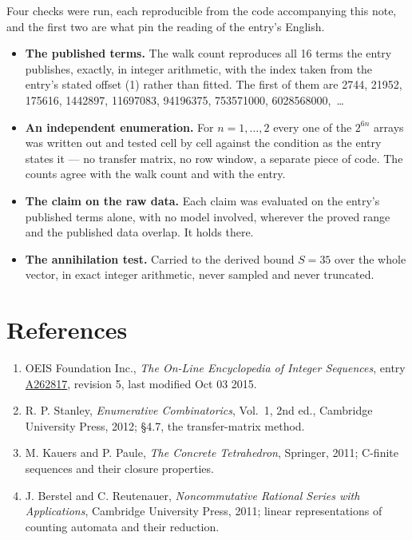 \documentclass[11pt]{article}
\theoremstyle{definition}
\begin{document}
Four checks were run, each reproducible from the code accompanying this note, and the first two are what pin the reading of the entry's English.

\begin{itemize}

\item {\bfseries The published terms.} The walk count reproduces all 16 terms the entry publishes, exactly, in integer arithmetic, with the index taken from the entry's stated offset (1) rather than fitted. The first of them are 2744, 21952, 175616, 1442897, 11697083, 94196375, 753571000, 6028568000,~\dots

\item {\bfseries An independent enumeration.} For $n = 1,\dots,2$ every one of the $2^{6n}$ arrays was written out and tested cell by cell against the condition as the entry states it --- no transfer matrix, no row window, a separate piece of code. The counts agree with the walk count and with the entry.

\item {\bfseries The claim on the raw data.} Each claim was evaluated on the entry's published terms alone, with no model involved, wherever the proved range and the published data overlap. It holds there.

\item {\bfseries The annihilation test.} Carried to the derived bound $S = 35$ over the whole vector, in exact integer arithmetic, never sampled and never truncated.

\end{itemize}

\section{References}

\begin{enumerate}

\item OEIS Foundation Inc., \emph{The On-Line Encyclopedia of Integer Sequences}, entry \href{https://oeis.org/A262817}{A262817}, revision 5, last modified Oct 03 2015.

\item R. P. Stanley, \emph{Enumerative Combinatorics}, Vol.~1, 2nd ed., Cambridge University Press, 2012; \S4.7, the transfer-matrix method.

\item M. Kauers and P. Paule, \emph{The Concrete Tetrahedron}, Springer, 2011; C-finite sequences and their closure properties.

\item J. Berstel and C. Reutenauer, \emph{Noncommutative Rational Series with Applications}, Cambridge University Press, 2011; linear representations of counting automata and their reduction.

\end{enumerate}
\end{document}
